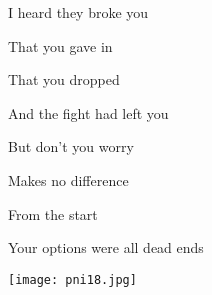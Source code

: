 \begin{strophe*}
  I heard they broke you\Pause{}

  That you gave in

  That you dropped

  And the fight had left you\chord[c]{\null}

  But don't you worry\Pause{}

  Makes no difference

  From the start

  Your options were all dead ends
\end{strophe*}
\playchorus

\vfill
\begin{center}
 \texttt{[image: pni18.jpg]}
\end{center}
\vfill